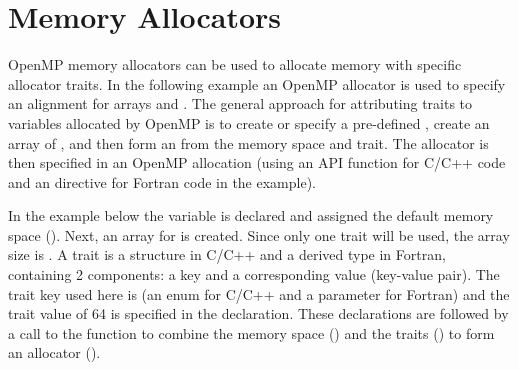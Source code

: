 \pagebreak
\section{Memory Allocators}
\label{sec:allocators}





OpenMP memory allocators can be used to allocate memory with
specific allocator traits.  In the following example an OpenMP allocator is used to
specify an alignment for arrays  and . The
general approach for attributing traits to variables allocated by
OpenMP is to create or specify a pre-defined , create an
array of , and then form an  from the
memory space and trait.
The allocator is then specified
in an OpenMP allocation (using an API  function
for C/C++ code and an  directive for Fortran code
in the  example).

In the example below the  variable is declared
and assigned the default memory space ().
Next, an array for  is created. Since only one
trait will be used, the array size is .
A trait is a structure in C/C++ and a derived type in Fortran,
containing 2 components: a key and a corresponding value (key-value pair).
The trait key used here is  (an enum for C/C++
and a parameter for Fortran)
and the trait value of 64 is specified in the  declaration.
These declarations are followed by a call to the
 function to combine the memory
space () and the traits ()
to form an allocator ().

